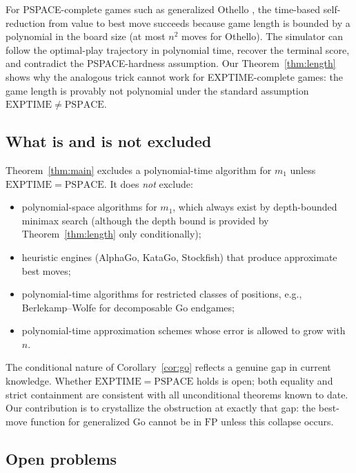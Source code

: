 \documentclass[11pt,a4paper]{amsart}
\theoremstyle{plain}
\theoremstyle{definition}
\theoremstyle{remark}
\newcommand{\FP}{\mathrm{FP}}
\newcommand{\EXPTIME}{\mathrm{EXPTIME}}
\newcommand{\PSPACE}{\mathrm{PSPACE}}
\begin{document}
For PSPACE-complete games such as generalized Othello \cite{IK94},
the time-based self-reduction from value to best move succeeds
because game length is bounded by a polynomial in the board size
(at most $n^2$ moves for Othello). The simulator can follow the
optimal-play trajectory in polynomial time, recover the terminal
score, and contradict the PSPACE-hardness assumption. Our
Theorem~\ref{thm:length} shows why the analogous trick cannot work
for EXPTIME-complete games: the game length is provably not
polynomial under the standard assumption $\EXPTIME \neq \PSPACE$.

\subsection{What is and is not excluded}

Theorem~\ref{thm:main} excludes a polynomial-time algorithm for
$m_1$ unless $\EXPTIME = \PSPACE$. It does \emph{not} exclude:
\begin{itemize}[nosep]
  \item polynomial-space algorithms for $m_1$, which always exist by
        depth-bounded minimax search (although the depth bound is
        provided by Theorem~\ref{thm:length} only conditionally);
  \item heuristic engines (AlphaGo, KataGo, Stockfish) that produce
        approximate best moves;
  \item polynomial-time algorithms for restricted classes of
        positions, e.g., Berlekamp--Wolfe \cite{BW94} for decomposable
        Go endgames;
  \item polynomial-time approximation schemes whose error is allowed
        to grow with $n$.
\end{itemize}

The conditional nature of Corollary~\ref{cor:go} reflects a genuine
gap in current knowledge. Whether $\EXPTIME = \PSPACE$ holds is open;
both equality and strict containment are consistent with all
unconditional theorems known to date. Our contribution is to
crystallize the obstruction at exactly that gap: the best-move
function for generalized Go cannot be in $\FP$ unless this collapse
occurs.

\subsection{Open problems}
\end{document}
